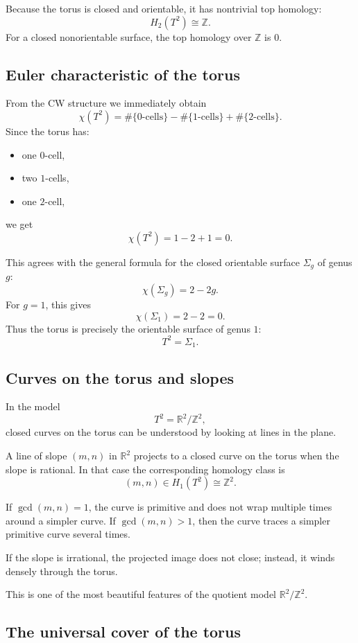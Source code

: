 \documentclass[12pt,a4paper]{article}
\theoremstyle{notespace}
\begin{document}
Because the torus is closed and orientable, it has nontrivial top homology:
\[
H_2(T^2)\cong \mathbb Z.
\]
For a closed nonorientable surface, the top homology over \(\mathbb Z\) is \(0\).

\subsection{Euler characteristic of the torus}

From the CW structure we immediately obtain
\[
\chi(T^2)=\#\{\text{\(0\)-cells}\}-\#\{\text{\(1\)-cells}\}+\#\{\text{\(2\)-cells}\}.
\]
Since the torus has:

\begin{itemize}
	\item one \(0\)-cell,
	\item two \(1\)-cells,
	\item one \(2\)-cell,
\end{itemize}
we get
\[
\chi(T^2)=1-2+1=0.
\]

This agrees with the general formula for the closed orientable surface \(\Sigma_g\) of genus \(g\):
\[
\chi(\Sigma_g)=2-2g.
\]
For \(g=1\), this gives
\[
\chi(\Sigma_1)=2-2=0.
\]
Thus the torus is precisely the orientable surface of genus \(1\):
\[
T^2=\Sigma_1.
\]

\subsection{Curves on the torus and slopes}

In the model
\[
T^2=\mathbb R^2/\mathbb Z^2,
\]
closed curves on the torus can be understood by looking at lines in the plane.

A line of slope \((m,n)\) in \(\mathbb R^2\) projects to a closed curve on the torus when the slope is rational. In that case the corresponding homology class is
\[
(m,n)\in H_1(T^2)\cong \mathbb Z^2.
\]

If \(\gcd(m,n)=1\), the curve is primitive and does not wrap multiple times around a simpler curve. If \(\gcd(m,n)>1\), then the curve traces a simpler primitive curve several times.

If the slope is irrational, the projected image does not close; instead, it winds densely through the torus.

This is one of the most beautiful features of the quotient model \(\mathbb R^2/\mathbb Z^2\).

\subsection{The universal cover of the torus}
\end{document}
